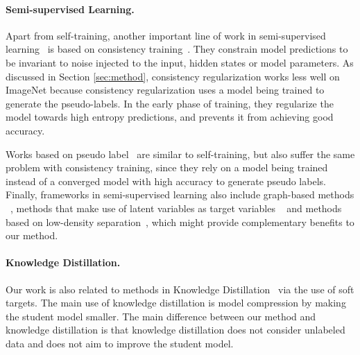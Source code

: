 \documentclass[10pt,twocolumn,letterpaper]{article}
\begin{document}
\paragraph{Semi-supervised Learning.} 
Apart from self-training, another important line of work in semi-supervised learning~\cite{chapelle2009semi,zhu2005semi} is based on consistency training~\cite{bachman2014learning,rasmus2015semi,laine2016temporal,tarvainen2017mean,miyato2018virtual,luo2018smooth,qiao2018deep,chen2018semi,clark2018semi,park2018adversarial,athiwaratkun2018there,li2019certainty,verma2019interpolation,uda,mixmatch,zhai2019s,lai2019bridging,berthelot2019remixmatch}. 
They constrain model predictions to be invariant to noise injected to the input, hidden states or model parameters. As discussed in Section \ref{sec:method}, consistency regularization works less well on ImageNet because consistency regularization uses a model being trained to generate the pseudo-labels. In the early phase of training, they regularize the model towards high entropy predictions, and prevents it from achieving good accuracy. 


Works based on pseudo label~\cite{lee2013pseudo,iscen2019label,shi2018transductive,arazo2019pseudo} are similar to self-training, but also suffer the same problem with consistency training, since they rely on a model being trained instead of a converged model with high accuracy to generate pseudo labels. 
Finally, frameworks in semi-supervised learning also include graph-based methods ~\cite{zhu2003semi,weston2012deep,yang2016revisiting,kipf2016semi}, methods that make use of latent variables as target variables ~\cite{kingma2014semi,maaloe2016auxiliary,yang2017semi} and methods based on low-density separation~\cite{grandvalet2005semi,salimans2016improved,dai2017good}, which might provide complementary benefits to our method.

\paragraph{Knowledge Distillation.} Our work is also related to methods in Knowledge Distillation~\cite{bucilu2006model,ba2014deep,hinton2015distilling,furlanello2018born,balan2015bayesian} via the  use  of soft targets. The main use of knowledge distillation is model compression by making the student model smaller. The main difference between our method and knowledge distillation is that knowledge distillation does not consider unlabeled data and does not aim to improve the student model.
\end{document}
